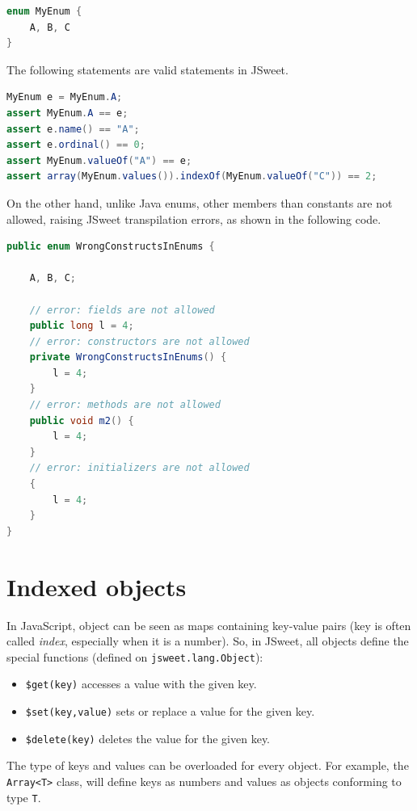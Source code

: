 \documentclass[a4paper]{report}
\begin{document}
\begin{lstlisting}[language=Java]
enum MyEnum {
	A, B, C
}
\end{lstlisting}

The following statements are valid statements in JSweet.

\begin{lstlisting}[language=Java]
MyEnum e = MyEnum.A;
assert MyEnum.A == e;
assert e.name() == "A";
assert e.ordinal() == 0;
assert MyEnum.valueOf("A") == e;
assert array(MyEnum.values()).indexOf(MyEnum.valueOf("C")) == 2;
\end{lstlisting}

On the other hand, unlike Java enums, other members than constants are not allowed, raising JSweet transpilation errors, as shown in the following code.

\begin{lstlisting}[language=Java]
public enum WrongConstructsInEnums {

	A, B, C;
	
	// error: fields are not allowed
	public long l = 4;
	// error: constructors are not allowed	
	private WrongConstructsInEnums() {
		l = 4;
	}
	// error: methods are not allowed
	public void m2() {
		l = 4;
	}
	// error: initializers are not allowed
	{
		l = 4;
	}
}
\end{lstlisting}

\section{Indexed objects}

In JavaScript, object can be seen as maps containing key-value pairs (key is often called \emph{index}, especially when it is a number). So, in JSweet, all objects define the special functions (defined on \texttt{jsweet.lang.Object}):

\begin{itemize}
\item \texttt{\$get(key)} accesses a value with the given key.
\item \texttt{\$set(key,value)} sets or replace a value for the given key.
\item \texttt{\$delete(key)} deletes the value for the given key.
\end{itemize}

The type of keys and values can be overloaded for every object. For example, the \texttt{Array<T>} class, will define keys as numbers and values as objects conforming to type \texttt{T}.
\end{document}
